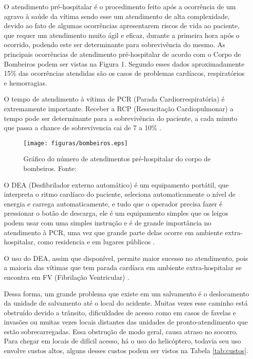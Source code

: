 O atendimento pré-hospitalar é o procedimento feito após a ocorrência de um agravo à saúde da vítima \cite{SBC} sendo esse um atendimento de alta complexidade, 
devido ao fato de algumas ocorrências apresentarem riscos de vida ao paciente, que requer um atendimento muito ágil e eficaz, durante a primeira hora após o ocorrido, 
podendo este ser determinante para sobrevivência do mesmo.\cite{PQA} 
As principais ocorrências de atendimento pré-hospitalar de acordo com o Corpo de Bombeiros podem ser vistas na Figura 1. Segundo esses dados aproximadamente 15\% das ocorrências atendidas são os casos de problemas cardíacos, respiratórios e hemorragias.


O tempo de atendimento à vítima de PCR (Parada Cardiorrespiratória) é extremamente importante. Receber a RCP (Ressucitação Cardiopulmonar) a tempo pode ser determinante para a sobrevivência do paciente, a cada minuto que passa a chance de sobrevivencia cai de 7 a 10\% \cite{SBC}. 
 \begin{figure}[H]
	\flushleft
		\texttt{[image: figuras/bombeiros.eps]}
	\caption[Gráfico do número de atendimentos pré-hospitalar do corpo de bombeiros]{Gráfico do número de atendimentos pré-hospitalar do corpo de bombeiros. Fonte: \cite{bombeiro}}
\end{figure}

O DEA (Desfibrilador externo automático) é um equipamento portátil, que interpreta o ritmo cardíaco do paciente, seleciona automaticamente o nível de energia e carrega automaticamente, e tudo que o operador precisa fazer é pressionar o botão de descarga, ele é um equipamento simples que os leigos podem usar com uma simples instrução e é de grande importância no atendimento à PCR, uma vez que grande parte delas ocorre em ambiente extra-hospitalar, como residencia e em lugares públicos \cite{SBC}.

O uso do DEA, assim que disponível, permite maior sucesso no atendimento, pois a maioria das vítimas que tem parada cardíaca em ambiente extra-hospitalar se encontra em FV (Fibrilação Ventricular) \cite{SBC}.

Dessa forma, um grande  problema  que existe em um salvamento é o deslocamento da unidade de salvamento até o local do acidente. Muitas vezes esse caminho está obstruído devido a trânsito, dificuldades de acesso como em casos de favelas e invasões ou muitas vezes locais distantes das unidades de pronto-atendimento que estão sobrecarregadas. Essa obstrução de modo geral, causa atraso no socorro.
Para chegar em locais de difícil acesso, há o uso do helicóptero, todavia seu uso envolve custos altos, alguns desses custos podem ser vistos
na Tabela \ref{tab:custos}.

